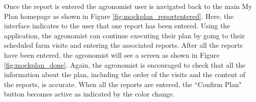 \newpage
\begin{flushleft}
Once the report is entered the agronomist user is navigated back to the main My Plan homepage as shown in Figure \ref{fig:mockplan_reportentered}. Here, the interface indicates to the user that one report has been entered. Using the application, the agronomist can continue executing their plan by going to their scheduled farm visits and entering the associated reports. After all the reports have been entered, the agronomist will see a screen as shown in Figure \ref{fig:mockplan_done}. Again, the agronomist is encouraged to check that all the information about the plan, including the order of the visits and the content of the reports, is accurate. When all the reports are entered, the “Confirm Plan" button becomes active as indicated by the color change. 
\end{flushleft}

